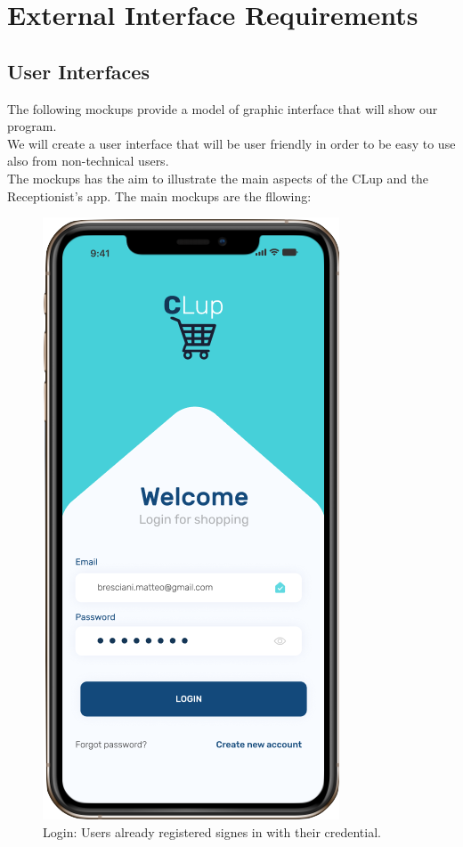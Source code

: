 \section{External Interface Requirements}
\subsection{User Interfaces}
The following mockups provide a model of graphic interface that will show our program. \\
We will create a user interface that will be user friendly in order to be easy to use also from non-technical users. \\
The mockups has the aim to illustrate the main aspects of the CLup and the Receptionist's app.
The main mockups are the fllowing:




\begin{figure}[h]
  \caption{Login: Users already registered signes in with their credential.}
  \label{fig:Login}
  \centering
  \includegraphics[scale=0.35]{images/mockup/login.png}

\end{figure}

